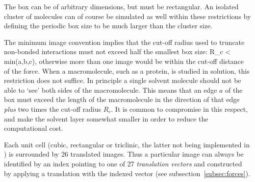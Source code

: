 The box can be of arbitrary dimensions, but must be rectangular. An
isolated cluster of molecules can of course be simulated as well within these
restrictions by defining the periodic box size to be much larger than
the cluster size.

The minimum image convention implies that the cut-off radius used to
truncate non-bonded interactions must not exceed half the smallest box
size:
\beq
  R_c < \half min(a,b,c),
\eeq
otherwise more than one image would be within the cut-off distance of
the force. When a macromolecule, such as a protein, is studied in
solution,  this restriction does not suffice. In principle a single
solvent  molecule should not be able
to `see' both sides of the macromolecule. This means that an edge $a$
of the box must exceed the length of the macromolecule in the
direction of that edge {\em plus} two times the cut-off radius $R_c$.
It is common to compromise in this respect, and make the solvent layer
somewhat smaller in order to reduce the computational cost.

Each unit cell (cubic, rectangular or triclinic, the latter not being
implemented in \gromacs) is surrounded by 26
translated images. Thus a particular image can always be identified by an index
pointing to one of 27 {\em translation vectors} and constructed by
applying a translation with the indexed vector (see
subsection~\ref{subsec:forces}). 

